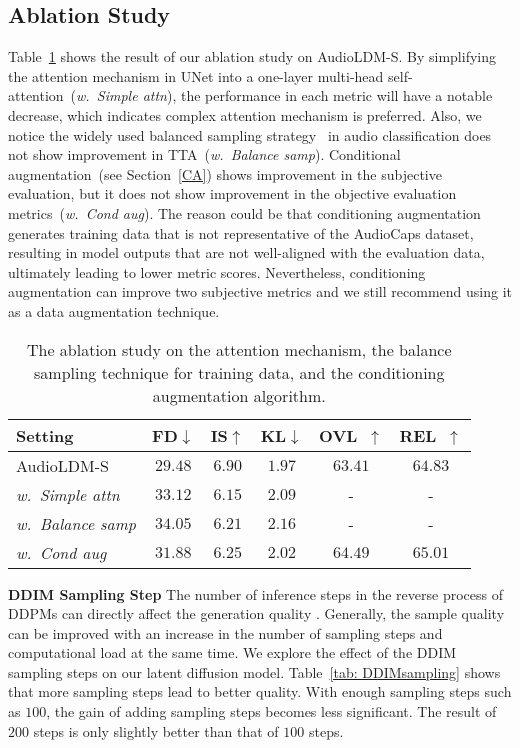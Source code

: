 \documentclass{article}
\begin{document}
\subsection{Ablation Study}

Table~\ref{tab: ablationstudy} shows the result of our ablation study on AudioLDM-S. By simplifying the attention mechanism in UNet into a one-layer multi-head self-attention~(\textit{w.~Simple attn}), the performance in each metric will have a notable decrease, which indicates complex attention mechanism is preferred. Also, we notice the widely used balanced sampling strategy~\cite{gong2021psla, liu2022ontology} in audio classification does not show improvement in TTA~(\textit{w.~Balance samp}). Conditional augmentation~(see Section~\ref{CA}) shows improvement in the subjective evaluation, but it does not show improvement in the objective evaluation metrics~(\textit{w.~Cond aug}). 
The reason could be that conditioning augmentation generates training data that is not representative of the AudioCaps dataset, resulting in model outputs that are not well-aligned with the evaluation data, ultimately leading to lower metric scores. Nevertheless, conditioning augmentation can improve two subjective metrics and we still recommend using it as a data augmentation technique.

\begin{table}[htbp]
\small
\centering
\begin{tabular}{lccc|cc}
\toprule
       Setting            & FD$\downarrow$   & IS$\uparrow$   & KL$\downarrow$  & OVL~$\uparrow$ & REL~$\uparrow$ \\
\midrule
AudioLDM-S      & $\mathbf{29.48}$ & $\mathbf{6.90}$ & $\mathbf{1.97}$ & $63.41$ & $64.83$ \\
\textit{w.~Simple attn}             & $33.12$ & $6.15$ & $2.09$ & - & - \\
\textit{w.~Balance samp} &  $34.05$     &   $6.21$   &  $2.16$   & - & - \\
\textit{w.~Cond aug}           & $31.88$ & $6.25$ & $2.02$ & $\mathbf{64.49}$ & $\mathbf{65.01}$  \\
\bottomrule
\end{tabular}
\caption{The ablation study on the attention mechanism, the balance sampling technique for training data, and the conditioning augmentation algorithm.}
\label{tab: ablationstudy}
\end{table}

\textbf{DDIM Sampling Step} The number of inference steps in the reverse process of DDPMs can directly affect the generation quality \cite{DDPM,SGM}. Generally, the sample quality can be improved with an increase in the number of sampling steps and computational load at the same time. We explore the effect of the DDIM~\cite{song2020denoising} sampling steps on our latent diffusion model. Table~\ref{tab: DDIMsampling} shows that more sampling steps lead to better quality. With enough sampling steps such as $100$, the gain of adding sampling steps becomes less significant. The result of $200$ steps is only slightly better than that of $100$ steps.
\end{document}
